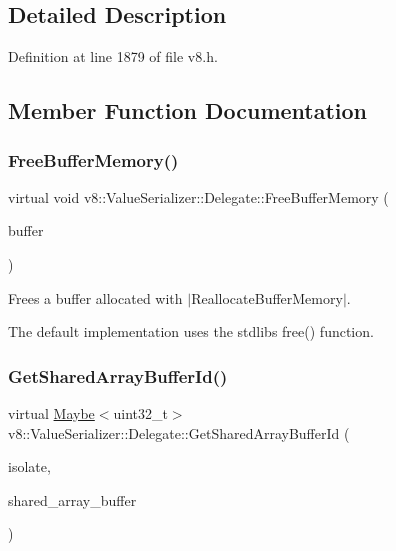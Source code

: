 \subsection{Detailed Description}


Definition at line 1879 of file v8.\+h.



\subsection{Member Function Documentation}
\mbox{\label{classv8_1_1ValueSerializer_1_1Delegate_a6cea3e757221e6e15b0fdb708482a176}} 
\subsubsection{\texorpdfstring{Free\+Buffer\+Memory()}{FreeBufferMemory()}}
{\footnotesize\ttfamily virtual void v8\+::\+Value\+Serializer\+::\+Delegate\+::\+Free\+Buffer\+Memory (\begin{DoxyParamCaption}\item[{void $\ast$}]{buffer }\end{DoxyParamCaption})\hspace{0.3cm}{\ttfamily [virtual]}}

Frees a buffer allocated with $\vert$\+Reallocate\+Buffer\+Memory$\vert$.

The default implementation uses the stdlib\textquotesingle{}s {\ttfamily free()} function. \mbox{\label{classv8_1_1ValueSerializer_1_1Delegate_a963946ef185d992552e8d9e0e4016137}} 
\subsubsection{\texorpdfstring{Get\+Shared\+Array\+Buffer\+Id()}{GetSharedArrayBufferId()}}
{\footnotesize\ttfamily virtual \mbox{\hyperlink{classv8_1_1Maybe}{Maybe}}$<$uint32\+\_\+t$>$ v8\+::\+Value\+Serializer\+::\+Delegate\+::\+Get\+Shared\+Array\+Buffer\+Id (\begin{DoxyParamCaption}\item[{Isolate $\ast$}]{isolate,  }\item[{\mbox{\hyperlink{classv8_1_1Local}{Local}}$<$ \mbox{\hyperlink{classv8_1_1SharedArrayBuffer}{Shared\+Array\+Buffer}} $>$}]{shared\+\_\+array\+\_\+buffer }\end{DoxyParamCaption})\hspace{0.3cm}{\ttfamily [virtual]}}

